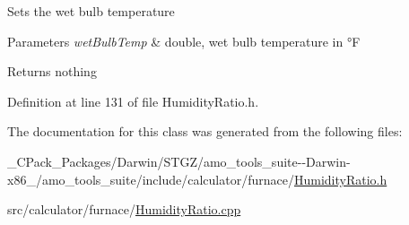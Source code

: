 Sets the wet bulb temperature


\begin{DoxyParams}{Parameters}
{\em wet\+Bulb\+Temp} & double, wet bulb temperature in °F\\
\hline
\end{DoxyParams}
\begin{DoxyReturn}{Returns}
nothing 
\end{DoxyReturn}


Definition at line 131 of file Humidity\+Ratio.\+h.



The documentation for this class was generated from the following files\+:\begin{DoxyCompactItemize}
\item 
\+\_\+\+C\+Pack\+\_\+\+Packages/\+Darwin/\+S\+T\+G\+Z/amo\+\_\+tools\+\_\+suite-\/-\/\+Darwin-\/x86\+\_/amo\+\_\+tools\+\_\+suite/include/calculator/furnace/\hyperlink{___c_pack___packages_2_darwin_2_s_t_g_z_2amo__tools__suite--_darwin-x86__64_2amo__tools__suite_2d441e7200aa76b63b61e223aa5b41c4c}{Humidity\+Ratio.\+h}\item 
src/calculator/furnace/\hyperlink{_humidity_ratio_8cpp}{Humidity\+Ratio.\+cpp}\end{DoxyCompactItemize}
